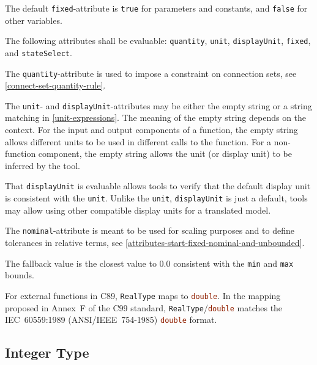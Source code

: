 The default \lstinline!fixed!-attribute is \lstinline!true! for parameters and constants, and \lstinline!false! for other variables.

The following attributes shall be evaluable: \lstinline!quantity!, \lstinline!unit!, \lstinline!displayUnit!, \lstinline!fixed!, and \lstinline!stateSelect!.

The \lstinline!quantity!-attribute is used to impose a constraint on connection sets, see \cref{connect-set-quantity-rule}.

The \lstinline!unit!- and \lstinline!displayUnit!-attributes may be either the empty string or a string matching  in \cref{unit-expressions}.
The meaning of the empty string depends on the context.
For the input and output components of a function, the empty string allows different units to be used in different calls to the function.
For a non-function component, the empty string allows the unit (or display unit) to be inferred by the tool.

\begin{nonnormative}
That \lstinline!displayUnit! is evaluable allows tools to verify that the default display unit is consistent with the \lstinline!unit!.
Unlike the \lstinline!unit!, \lstinline!displayUnit! is just a default, tools may allow using other compatible display units for a translated model.
\end{nonnormative}

The \lstinline!nominal!-attribute is meant to be used for scaling purposes and to define tolerances in relative terms, see \cref{attributes-start-fixed-nominal-and-unbounded}.

The fallback value is the closest value to $0.0$ consistent with the \lstinline!min! and \lstinline!max! bounds.

\begin{nonnormative}
For external functions in C89, \lstinline!RealType! maps to \lstinline[language=C]!double!.
In the mapping proposed in Annex~F of the C99 standard, \lstinline!RealType!/\lstinline[language=C]!double! matches the IEC~60559:1989 (ANSI/IEEE~754-1985) \lstinline[language=C]!double! format.
\end{nonnormative}

\subsection{Integer Type}\label{integer-type}

